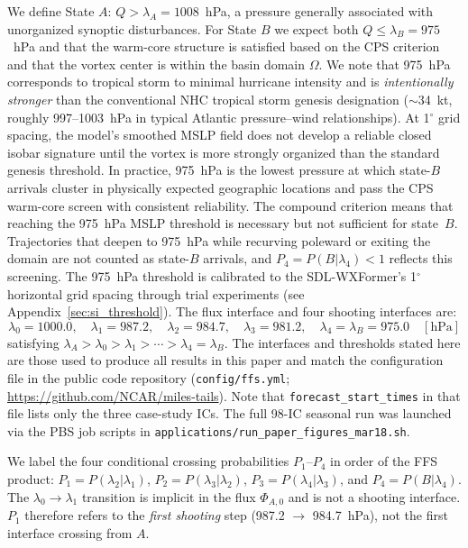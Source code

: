 \documentclass[11pt]{article}
\begin{document}
We define State $A$: $Q > \lambda_A = 1008$~hPa, a pressure generally associated with unorganized synoptic disturbances.
For State $B$ we expect both $Q \leq \lambda_B = 975$~hPa and that the warm-core structure is satisfied based on the CPS criterion and that the vortex center is within the basin domain $\Omega$.
We note that 975~hPa corresponds to tropical storm to minimal hurricane intensity and is \textit{intentionally stronger} than the conventional NHC tropical storm genesis designation
($\sim$34~kt, roughly 997--1003~hPa in typical Atlantic pressure--wind relationships).
At 1$^\circ$ grid spacing, the model's smoothed MSLP field does not develop a reliable closed
isobar signature until the vortex is more strongly organized than the standard genesis threshold.
In practice, 975~hPa is the lowest pressure at which state-$B$ arrivals cluster in physically expected
geographic locations and pass the CPS warm-core screen with consistent reliability.
The compound criterion means that reaching the 975~hPa MSLP threshold is necessary but not sufficient
for state~$B$. Trajectories that deepen to 975~hPa while recurving poleward or exiting the domain
are not counted as state-$B$ arrivals, and $P_4 = P(B|\lambda_4) < 1$ reflects this screening.
The 975~hPa threshold is calibrated to the SDL-WXFormer's 1$^\circ$ horizontal
grid spacing through trial experiments (see Appendix~\ref{sec:si_threshold}).
The flux interface and four shooting interfaces are:
\begin{equation*}
\lambda_0 = 1000.0,\quad
\lambda_1 = 987.2,\quad
\lambda_2 = 984.7,\quad
\lambda_3 = 981.2,\quad
\lambda_4 = \lambda_B = 975.0 \quad [\text{hPa}]
\end{equation*}
satisfying $\lambda_A > \lambda_0 > \lambda_1 > \cdots > \lambda_4 = \lambda_B$.
The interfaces and thresholds stated here are those used to produce all results in this paper
and match the configuration file in the public code repository
(\texttt{config/ffs.yml}; \url{https://github.com/NCAR/miles-tails}).
Note that \texttt{forecast\_start\_times} in that file lists only the three case-study ICs.
The full 98-IC seasonal run was launched via the PBS job scripts in
\texttt{applications/run\_paper\_figures\_mar18.sh}.


We label the four conditional crossing probabilities $P_1$--$P_4$ in order of the
FFS product: $P_1 = P(\lambda_2|\lambda_1)$, $P_2 = P(\lambda_3|\lambda_2)$,
$P_3 = P(\lambda_4|\lambda_3)$, and $P_4 = P(B|\lambda_4)$.
The $\lambda_0\to\lambda_1$ transition is implicit in the flux $\Phi_{A,0}$ and is
not a shooting interface. $P_1$ therefore refers to the \textit{first shooting} step
(987.2 $\to$ 984.7~hPa), not the first interface crossing from $A$.
\end{document}
